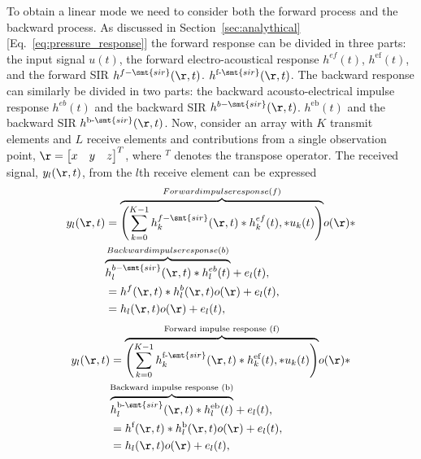 To obtain a linear mode we need to consider both the forward process and the backward process.
As discussed in Section~\ref{sec:analythical} [Eq.~\eqref{eq:pressure_response}] the forward response can be
divided in three parts: the input signal $u(t)$, the forward electro-acoustical response
%
{
  $h^{ef}(t)$,
}{
  $h^\text{ef}(t)$,
}
and the forward SIR
{
  $h^{{f-}\smt{sir}}(\r,t)$.
}{
  $h^{\text{f-}\smt{sir}}(\r,t)$.
}
The backward response can similarly be divided in two parts: the
backward acousto-electrical impulse
response
{
  $h^{eb}(t)$ and the backward SIR $h^{{b-}\smt{sir}}(\r,t)$.
}{
  $h^\text{eb}(t)$ and the backward SIR $h^{\text{b-}\smt{sir}}(\r,t)$.
}
Now, consider an array with $K$ transmit elements and $L$ receive elements and contributions from a single observation
point, $\r = \begin{bmatrix} x &y & z\end{bmatrix}^T$, where ${}^T$ denotes the transpose operator.
The received signal, $y_l(\r,t)$, from the $l$th receive element can be expressed
{
  \begin{equation}
    \begin{split}
      y_l(\r,t) & =
      \overset{{Forward impulse response (f)}}{\overbrace{\left( \sum_{k=0}^{K-1}
            h^{{f-}\smt{sir}}_k(\r,t) * h_{k}^{ef}(t),
            * u_k(t) \right)}} o(\r) * \\
      & \overset{{Backward impulse response (b)}}{\overbrace{h^{{b-}\smt{sir}}_l(\r,t) *  h_{l}^{eb}(t)}} + e_l(t), \\
      & = h^{f}(\r,t) * h_l^{b}(\r,t) o(\r) + e_l(t), \\
      & = h_l(\r,t) o(\r) + e_l(t),
    \end{split}
    \label{eq:discrete_system_impulse_response}
  \end{equation}
}{
  \begin{equation}
    \begin{split}
      y_l(\r,t) & =
      \overset{\text{Forward impulse response (f)}}{\overbrace{\left( \sum_{k=0}^{K-1}
            h^{\text{f-}\smt{sir}}_k(\r,t) * h_{k}^\text{ef}(t),
            * u_k(t) \right)}} o(\r) * \\
      & \overset{\text{Backward impulse response (b)}}{\overbrace{h^{\text{b-}\smt{sir}}_l(\r,t) *  h_{l}^\text{eb}(t)}} + e_l(t), \\
      & = h^\text{f}(\r,t) * h_l^\text{b}(\r,t) o(\r) + e_l(t), \\
      & = h_l(\r,t) o(\r) + e_l(t),
    \end{split}
    \label{eq:discrete_system_impulse_response}
  \end{equation}
}
